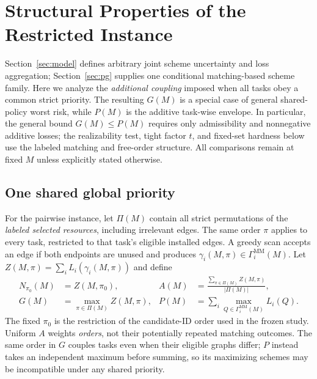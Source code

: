 \documentclass[sigconf, nonacm]{acmart}
\begin{document}
\section{Structural Properties of the Restricted Instance}
\label{sec:objectives}

Section~\ref{sec:model} defines arbitrary joint scheme
uncertainty and loss aggregation; Section~\ref{sec:pg}
supplies one conditional matching-based scheme family.
Here we analyze the \emph{additional coupling} imposed
when all tasks obey a common strict priority. The
resulting $G(M)$ is a special case of general
shared-policy worst risk, while $P(M)$ is the additive
task-wise envelope. In particular, the general bound
$G(M)\leq P(M)$ requires only admissibility and
nonnegative additive losses; the realizability test,
tight factor $t$, and fixed-set hardness below use
the labeled matching and free-order structure.
All comparisons remain at fixed $M$ unless explicitly
stated otherwise.

\subsection{One shared global priority}
For the pairwise instance, let \(\Pi(M)\) contain all strict
permutations of the \emph{labeled selected resources}, including
irrelevant edges. The same order \(\pi\) applies to every task,
restricted to that task's eligible installed edges. A greedy scan
accepts an edge if both endpoints are unused and produces
\(\gamma_i(M,\pi)\in\Gamma_i^{\mathrm{MM}}(M)\).
Let \(Z(M,\pi)=\sum_iL_i(\gamma_i(M,\pi))\) and define
\begin{align}
N_{\pi_0}(M)&=Z(M,\pi_0),&
A(M)&=\frac{\sum_{\pi\in\Pi(M)}Z(M,\pi)}{|\Pi(M)|},
\label{eq:na}\\
G(M)&=\max_{\pi\in\Pi(M)}Z(M,\pi),&
P(M)&=\sum_i\max_{Q\in\Gamma_i^{\mathrm{MM}}(M)}L_i(Q).
\label{eq:gp}
\end{align}
The fixed \(\pi_0\) is the restriction of the candidate-ID
order used in the frozen study. Uniform \(A\) weights
\emph{orders}, not their potentially repeated matching outcomes.
The same order in \(G\) couples tasks even when their eligible
graphs differ; \(P\) instead takes an independent maximum
before summing, so its maximizing schemes may be incompatible
under any shared priority.
\end{document}
